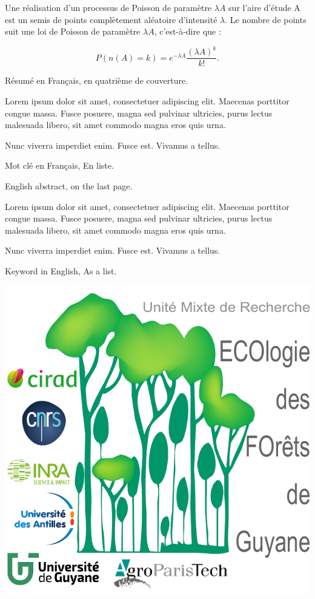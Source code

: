 \documentclass[
  11pt,
  french,
  A4paper,
  extrafontsizes,onecolumn,openright
  ]{memoir}
\theoremstyle{definition}
\theoremstyle{definition}
\theoremstyle{definition}
\theoremstyle{remark}
\begin{document}
Une réalisation d'un processus de Poisson de paramètre \(\lambda A\) sur
l'aire d'étude A est un semis de points complètement aléatoire
d'intensité \(\lambda\). Le nombre de points suit une loi de Poisson de
paramètre \(\lambda A\), c'est-à-dire que :

\begin{equation}
  P(n(A)=k) = e^{-\lambda A} \frac{(\lambda A)^k}{k!}.
  \label{eq:Poisson}
\end{equation}



\backmatter
\SmallMargins

%
\printbibliography










\evenpage
\SmallMargins
\thispagestyle{empty}

\begin{normalsize}

\begin{description}

\item[Résumé:]
Résumé en Français, en quatrième de couverture.

Lorem ipsum dolor sit amet, consectetuer adipiscing elit. Maecenas
porttitor congue massa. Fusce posuere, magna sed pulvinar ultricies,
purus lectus malesuada libero, sit amet commodo magna eros quis urna.

Nunc viverra imperdiet enim. Fusce est. Vivamus a tellus.

\item[Mots clés :]
Mot clé en Français, En liste.
~\\

\item[Abstract:]
English abstract, on the last page.

Lorem ipsum dolor sit amet, consectetuer adipiscing elit. Maecenas
porttitor congue massa. Fusce posuere, magna sed pulvinar ultricies,
purus lectus malesuada libero, sit amet commodo magna eros quis urna.

Nunc viverra imperdiet enim. Fusce est. Vivamus a tellus.

\item[Keywords:]
Keyword in English, As a list.

\end{description}

\end{normalsize}

\vspace*{\fill}
\centering\includegraphics[width=.3\textwidth]{images/Logo-Lab}
\end{document}
